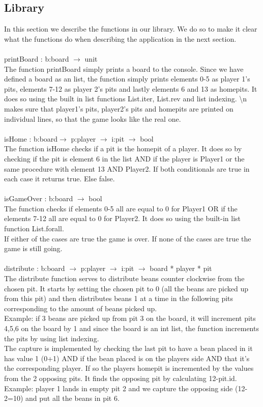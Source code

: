 \documentclass{article}
\begin{document}
\subsection*{Library}
In this section we describe the functions in our library. We do so to make it clear what the functions do when describing the application in the next section.\\
\\
printBoard : b:board $\rightarrow$ unit\\
The function printBoard simply prints a board to the console. Since we have defined a board as an list, the function simply prints elements 0-5 as player 1's pits, elements 7-12 as player 2's pits and lastly elements 6 and 13 as homepits.
It does so using the built in list functions List.iter, List.rev and list indexing. \textbackslash n makes sure that player1's pits, player2's pits and homepits are printed on individual lines, so that the game looks like the real one.\\
\\
isHome : b:board$\rightarrow$ p:player $\rightarrow$ i:pit $\rightarrow$ bool\\
The function isHome checks if a pit is the homepit of a player. It does so by checking if the pit is element 6 in the list AND if the player is Player1 or the same procedure with element 13 AND Player2. If both conditionals are true in each case it returns true.
Else false.\\
\\
isGameOver : b:board $\rightarrow$ bool\\
The function checks if elements 0-5 all are equal to 0 for Player1 OR if the elements 7-12 all are equal to 0 for Player2. It does so using the built-in list function List.forall.\\ If either of the cases are true the game is over. If none of the cases are true the game is still going.\\
\\
distribute : b:board $\rightarrow$ p:player $\rightarrow$ i:pit $\rightarrow$ board * player * pit\\
The distribute function serves to distribute beans counter clockwise from the chosen pit.
It starts by setting the chosen pit to 0 (all the beans are picked up from this pit) and then distributes beans 1 at a time in the following pits corresponding to the amount of beans picked up.\\
Example: if 3 beans are picked up from pit 3 on the board, it will increment pits 4,5,6 on the board by 1 and since the board is an int list, the function increments the pits by using list indexing.\\
The capture is implemented by checking the last pit to have a bean placed in it has value 1 (0+1) AND if the bean placed is on the players side AND that it's the corresponding player. If so the players homepit is incremented by the values from the 2 opposing pits. It finds the opposing pit by calculating 12-pit.id. 
Example: player 1 lands in empty pit 2 and we capture the opposing side (12-2=10) and put all the beans in pit 6.\\
\end{document}
